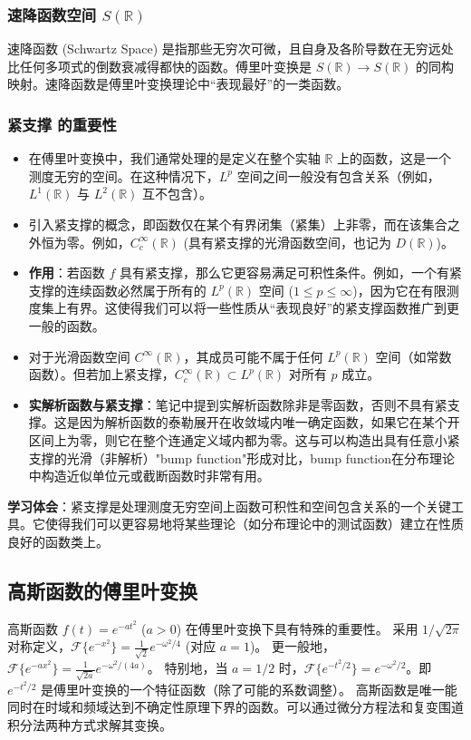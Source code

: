 \documentclass[UTF8]{ctexart}
\begin{document}
	\subsubsection{速降函数空间 $S(\mathbb{R})$}
	速降函数 (Schwartz Space) 是指那些无穷次可微，且自身及各阶导数在无穷远处比任何多项式的倒数衰减得都快的函数。傅里叶变换是 $S(\mathbb{R}) \to S(\mathbb{R})$ 的同构映射。速降函数是傅里叶变换理论中“表现最好”的一类函数。
	
	\subsubsection{紧支撑 的重要性}
	\begin{itemize}
		\item 在傅里叶变换中，我们通常处理的是定义在整个实轴 $\mathbb{R}$ 上的函数，这是一个测度无穷的空间。在这种情况下，$L^p$ 空间之间一般没有包含关系（例如，$L^1(\mathbb{R})$ 与 $L^2(\mathbb{R})$ 互不包含）。
		\item 引入紧支撑的概念，即函数仅在某个有界闭集（紧集）上非零，而在该集合之外恒为零。例如，$C_c^\infty(\mathbb{R})$ (具有紧支撑的光滑函数空间，也记为 $D(\mathbb{R})$)。
		\item \textbf{作用}：若函数 $f$ 具有紧支撑，那么它更容易满足可积性条件。例如，一个有紧支撑的连续函数必然属于所有的 $L^p(\mathbb{R})$ 空间 ($1 \le p \le \infty$)，因为它在有限测度集上有界。这使得我们可以将一些性质从“表现良好”的紧支撑函数推广到更一般的函数。
		\item 对于光滑函数空间 $C^\infty(\mathbb{R})$，其成员可能不属于任何 $L^p(\mathbb{R})$ 空间（如常数函数）。但若加上紧支撑，$C_c^\infty(\mathbb{R}) \subset L^p(\mathbb{R})$ 对所有 $p$ 成立。
		\item \textbf{实解析函数与紧支撑}：笔记中提到实解析函数除非是零函数，否则不具有紧支撑。这是因为解析函数的泰勒展开在收敛域内唯一确定函数，如果它在某个开区间上为零，则它在整个连通定义域内都为零。这与可以构造出具有任意小紧支撑的光滑（非解析）"bump function"形成对比，bump function在分布理论中构造近似单位元或截断函数时非常有用。
	\end{itemize}
	
	\textbf{学习体会}：紧支撑是处理测度无穷空间上函数可积性和空间包含关系的一个关键工具。它使得我们可以更容易地将某些理论（如分布理论中的测试函数）建立在性质良好的函数类上。
	
	\subsection{高斯函数的傅里叶变换}
	高斯函数 $f(t) = e^{-at^2}$ ($a>0$) 在傅里叶变换下具有特殊的重要性。
	采用 $1/\sqrt{2\pi}$ 对称定义，$\mathcal{F}\{e^{-x^2}\} = \frac{1}{\sqrt{2}}e^{-\omega^2/4}$ (对应 $a=1$)。
	更一般地，$\mathcal{F}\{e^{-ax^2}\} = \frac{1}{\sqrt{2a}}e^{-\omega^2/(4a)}$。
	特别地，当 $a=1/2$ 时，$\mathcal{F}\{e^{-t^2/2}\} = e^{-\omega^2/2}$。即 $e^{-t^2/2}$ 是傅里叶变换的一个特征函数（除了可能的系数调整）。
	高斯函数是唯一能同时在时域和频域达到不确定性原理下界的函数。可以通过微分方程法和复变围道积分法两种方式求解其变换。
	
\end{document}
